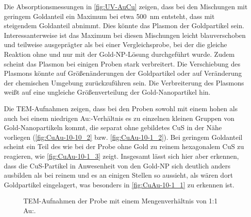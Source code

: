	Die Absorptionsmessungen in \cref{fig:UV-AuCu} zeigen, dass bei den Mischungen mit geringem Goldanteil ein Maximum bei etwa \SI{500}{\nano\meter} entsteht, dass mit steigendem Goldanteil abnimmt.
	Dies könnte das Plasmon der Goldpartikel sein.
	Interessanterweise ist das Maximum bei diesen Mischungen leicht blauverschoben und teilweise ausgeprägter als bei einer Vergleichsprobe, bei der die gleiche Reaktion ohne  und nur mit der Gold-NP-Lösung durchgeführt wurde.
	Zudem scheint das Plasmon bei einigen Proben stark verbreitert.
	Die Verschiebung des Plasmons könnte auf Größenänderungen der Goldpartikel oder  auf Veränderung der chemischen Umgebung zurückzuführen sein. 
	Die Verbreiterung des Plasmons weißt auf eine ungleiche Größenverteilung der Gold-Nanopartikel hin.
	
	Die TEM-Aufnahmen zeigen, dass bei den Proben sowohl mit einem hohen als auch bei einem niedrigen Au:-Verhältnis es zu einzelnen kleinen Gruppen von Gold-Nanopartikeln kommt, die separat ohne gebildetes CuS in der Nähe vorliegen (\cref{fig:CuAu-10-10_2} bzw. \cref{fig:CuAu-10-1_2}).
	Bei geringem Goldanteil scheint ein Teil des  wie bei der Probe ohne Gold zu reinem hexagonalem CuS zu reagieren, wie \cref{fig:CuAu-10-1_3} zeigt.
	Insgesamt lässt sich hier aber erkennen, dass die CuS-Partikel in Anwesenheit von den Gold-NP sich deutlich anders ausbilden als bei reinem  und es an einigen Stellen so aussieht, als wären dort Goldpartikel eingelagert, was besonders in \cref{fig:CuAu-10-1_1} zu erkennen ist.
	
	\begin{figure}[H]
		\centering
		\caption{TEM-Aufnahmen der Probe mit einem Mengenverhältnis von 1:1 Au:.}
		\label{fig:TEM-CuAu-10-10}
	\end{figure}
	
